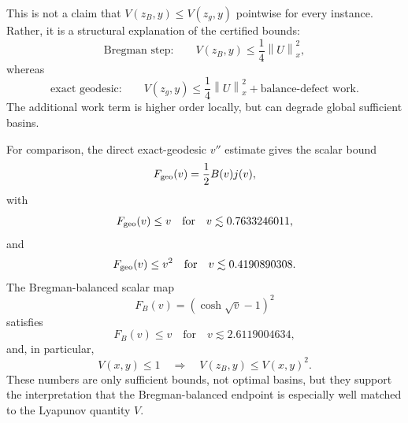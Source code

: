 \documentclass[11pt]{article}
\newcommand{\norm}[1]{\left\lVert #1\right\rVert}
\begin{document}
This is not a claim that $V(z_B,y)\le V(z_g,y)$ pointwise for every instance. Rather, it is a structural explanation of the certified bounds:
\[
    \text{Bregman step:}
    \qquad
    V(z_B,y)
    \le
    \frac14\norm{U}_x^2,
\]
whereas
\[
    \text{exact geodesic:}
    \qquad
    V(z_g,y)
    \le
    \frac14\norm{U}_x^2
    +
    \text{balance-defect work}.
\]
The additional work term is higher order locally, but can degrade global sufficient basins.

For comparison, the direct exact-geodesic $v''$ estimate gives the scalar bound
\[
    F_{\rm geo}(v)=\frac12B(v)j(v),
\]
with
\[
    F_{\rm geo}(v)\le v
    \quad\text{for}\quad
    v\lesssim 0.7633246011,
\]
and
\[
    F_{\rm geo}(v)\le v^2
    \quad\text{for}\quad
    v\lesssim 0.4190890308.
\]
The Bregman-balanced scalar map
\[
    F_B(v)=(\cosh\sqrt v-1)^2
\]
satisfies
\[
    F_B(v)\le v
    \quad\text{for}\quad
    v\lesssim 2.6119004634,
\]
and, in particular,
\[
    V(x,y)\le1
    \quad\Longrightarrow\quad
    V(z_B,y)\le V(x,y)^2.
\]
These numbers are only sufficient bounds, not optimal basins, but they support the interpretation that the Bregman-balanced endpoint is especially well matched to the Lyapunov quantity $V$.
\end{document}
